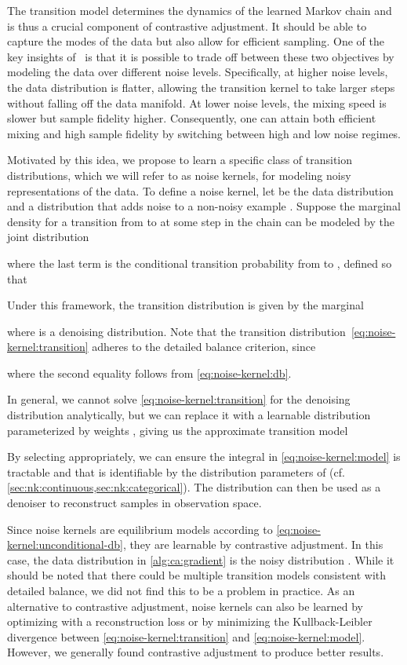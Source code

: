 \documentclass[10pt,twocolumn,letterpaper]{article}
\begin{document}
The transition model determines the dynamics of the learned Markov chain and is thus a crucial component of contrastive adjustment.
It should be able to capture the modes of the data but also allow for efficient sampling.
One of the key insights of~\textcite{song2019generative} is that it is possible to trade off between these two objectives by modeling the data over different noise levels.
Specifically, at higher noise levels, the data distribution is flatter, allowing the transition kernel to take larger steps without falling off the data manifold.
At lower noise levels, the mixing speed is slower but sample fidelity higher.
Consequently, one can attain both efficient mixing and high sample fidelity by switching between high and low noise regimes.

Motivated by this idea, we propose to learn a specific class of transition distributions, which we will refer to as noise kernels, for modeling noisy representations of the data.
To define a noise kernel, let  be the data distribution and  a distribution that adds noise to a non-noisy example .
Suppose the marginal density for a transition from  to  at some step in the chain can be modeled by the joint distribution

where the last term is the conditional transition probability from  to , defined so that

Under this framework, the transition distribution is given by the marginal

where  is a denoising distribution.
Note that the transition distribution~\eqref{eq:noise-kernel:transition} adheres to the detailed balance criterion, since

where the second equality follows from \cref{eq:noise-kernel:db}.

In general, we cannot solve \cref{eq:noise-kernel:transition} for the denoising distribution  analytically, but we can replace it with a learnable distribution  parameterized by weights , giving us the approximate transition model

By selecting  appropriately, we can ensure the integral in \cref{eq:noise-kernel:model} is tractable and that  is identifiable by the distribution parameters of  (cf. \cref{sec:nk:continuous,sec:nk:categorical}).
The distribution  can then be used as a denoiser to reconstruct samples in observation space.

Since noise kernels are equilibrium models according to \cref{eq:noise-kernel:unconditional-db}, they are learnable by contrastive adjustment.
In this case, the data distribution in \cref{alg:ca:gradient} is the noisy distribution .
While it should be noted that there could be multiple transition models  consistent with detailed balance, we did not find this to be a problem in practice.
As an alternative to contrastive adjustment, noise kernels can also be learned by optimizing  with a reconstruction loss or by minimizing the Kullback-Leibler divergence between \cref{eq:noise-kernel:transition} and \cref{eq:noise-kernel:model}.
However, we generally found contrastive adjustment to produce better results.
\end{document}
